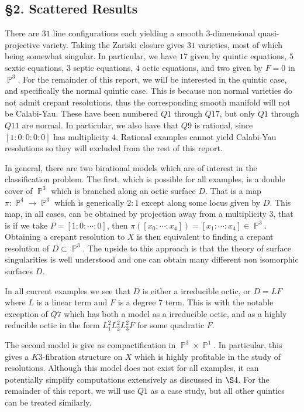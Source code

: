 \documentclass{article}
\DeclareMathOperator{\PP}{\mathbb{P}}
\begin{document}
\subsection*{\S 2. Scattered Results}

There are $31$ line configurations each yielding a smooth $3$-dimensional quasi-projective variety. Taking the Zariski closure gives $31$ varieties, most of which being somewhat singular. In particular, we have $17$ given by quintic equations, $5$ sextic equations, $3$ septic equations, $4$ octic equations, and two given by $F = 0$ in $\PP^3$. For the remainder of this report, we will be interested in the quintic case, and specifically the normal quintic case. This is because non normal varieties do not admit crepant resolutions, thus the corresponding smooth manifold will not be Calabi-Yau. These have been numbered $Q1$ through $Q17$, but only $Q1$ through $Q11$ are normal. In particular, we also have that $Q9$ is rational, since $[1 : 0 : 0 : 0 : 0]$ has multiplicity $4$. Rational examples cannot yield Calabi-Yau resolutions so they will excluded from the rest of this report.

In general, there are two birational models which are of interest in the classification problem. The first, which is possible for all examples, is a double cover of $\PP^3$ which is branched along an octic surface $D$. That is a map $\pi : \PP^4 \to \PP^3$ which is generically $2 : 1$ except along some locus given by $D$. This map, in all cases, can be obtained by projection away from a multiplicity $3$, that is if we take $P = [1 : 0 : \cdots : 0]$, then $\pi([x_0 : \cdots : x_4]) = [x_1 : \cdots : x_4] \in \PP^3$. Obtaining a crepant resolution to $X$ is then equivalent to finding a crepant resolution of $D \subset \PP^3$. The upside to this approach is that the theory of surface singularities is well understood and one can obtain many different non isomorphic surfaces $D$.

In all current examples we see that $D$ is either a irreducible octic, or $D = LF$ where $L$ is a linear term and $F$ is a degree $7$ term. This is with the notable exception of $Q7$ which has both a model as a irreducible octic, and as a highly reducible octic in the form $L_1^2L_2^2L_3^2F$ for some quadratic $F$.

The second model is give as compactification in $\PP^3 \times \PP^1$. In particular, this gives a $K3$-fibration structure on $X$ which is highly profitable in the study of resolutions. Although this model does not exist for all examples, it can potentially simplify computations extensively as discussed in $\S 4$. For the remainder of this report, we will use $Q1$ as a case study, but all other quintics can be treated similarly.
\end{document}
